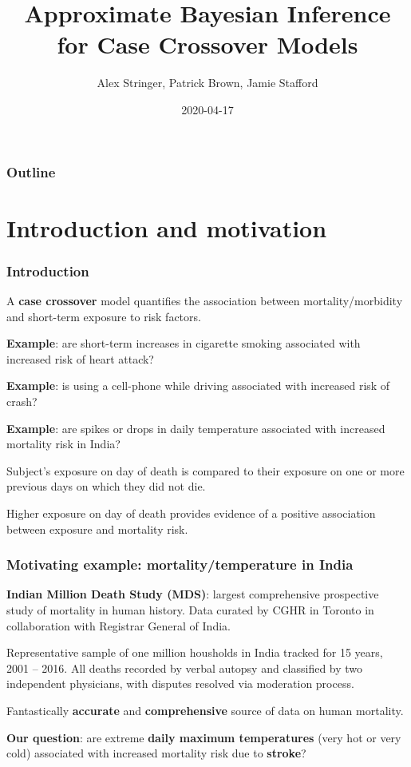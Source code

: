 \documentclass[10pt,usenames,dvipsnames,t]{beamer}
\title{Approximate Bayesian Inference for Case Crossover Models}
\author{Alex Stringer, Patrick Brown, Jamie Stafford}
\institute{University of Toronto and Centre for Global Health Research, St. Michael's Hospital}
\date{2020-04-17}
\begin{document}
\begin{frame}
\titlepage

\end{frame}

\begin{frame}
\frametitle{Outline}
\tableofcontents
\end{frame}

\section{Introduction and motivation}

\begin{frame}
\frametitle{Introduction}

A \textbf{case crossover} model quantifies the association between mortality/morbidity and short-term exposure to risk factors.

\pause

\textbf{Example}: are short-term increases in cigarette smoking associated with increased risk of heart attack?

\pause

\textbf{Example}: is using a cell-phone while driving associated with increased risk of crash?

\pause

\textbf{Example}: \textcolor{bostonuniversityred}{are spikes or drops in daily temperature associated with increased mortality risk in India?}

\pause

Subject's exposure on day of death is compared to their exposure on one or more previous days on which they did not die.

\pause

Higher exposure on day of death provides evidence of a positive association between exposure and mortality risk.

\end{frame}

\begin{frame}
\frametitle{Motivating example: mortality/temperature in India}

\textbf{Indian Million Death Study (MDS)}: largest comprehensive prospective study of mortality in human history. Data curated by CGHR in Toronto in collaboration with Registrar General of India.

\pause

Representative sample of one million housholds in India tracked for 15 years, 2001 -- 2016. All deaths recorded by verbal autopsy and classified by two independent physicians, with disputes resolved via moderation process.

\pause

Fantastically \textbf{accurate} and \textbf{comprehensive} source of data on human mortality.

\pause

\textbf{Our question}: are extreme \textbf{daily maximum temperatures} (very hot or very cold) associated with increased mortality risk due to \textbf{stroke}?

\end{frame}
\end{document}
